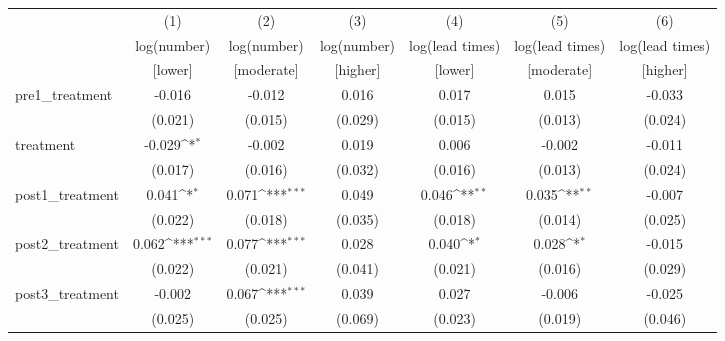 {
\def\sym#1{\ifmmode^{#1}\else\(^{#1}\)\fi}
\begin{adjustbox}{max width=\textwidth}
\begin{tabular}{l*{6}{c}}
\toprule
            &\multicolumn{1}{c}{(1)}&\multicolumn{1}{c}{(2)}&\multicolumn{1}{c}{(3)}&\multicolumn{1}{c}{(4)}&\multicolumn{1}{c}{(5)}&\multicolumn{1}{c}{(6)}\\
            &\multicolumn{1}{c}{log(number)}&\multicolumn{1}{c}{log(number)}&\multicolumn{1}{c}{log(number)}&\multicolumn{1}{c}{log(lead times)}&\multicolumn{1}{c}{log(lead times)}&\multicolumn{1}{c}{log(lead times)}\\
&[lower]&[moderate]&[higher]&[lower]&[moderate]&[higher]\\
\midrule
pre1\_treatment&      -0.016         &      -0.012         &       0.016         &       0.017         &       0.015         &      -0.033         \\
            &     (0.021)         &     (0.015)         &     (0.029)         &     (0.015)         &     (0.013)         &     (0.024)         \\
\addlinespace
treatment   &      -0.029\sym{*}  &      -0.002         &       0.019         &       0.006         &      -0.002         &      -0.011         \\
            &     (0.017)         &     (0.016)         &     (0.032)         &     (0.016)         &     (0.013)         &     (0.024)         \\
\addlinespace
post1\_treatment&       0.041\sym{*}  &       0.071\sym{***}&       0.049         &       0.046\sym{**} &       0.035\sym{**} &      -0.007         \\
            &     (0.022)         &     (0.018)         &     (0.035)         &     (0.018)         &     (0.014)         &     (0.025)         \\
\addlinespace
post2\_treatment&       0.062\sym{***}&       0.077\sym{***}&       0.028         &       0.040\sym{*}  &       0.028\sym{*}  &      -0.015         \\
            &     (0.022)         &     (0.021)         &     (0.041)         &     (0.021)         &     (0.016)         &     (0.029)         \\
\addlinespace
post3\_treatment&      -0.002         &       0.067\sym{***}&       0.039         &       0.027         &      -0.006         &      -0.025         \\
            &     (0.025)         &     (0.025)         &     (0.069)         &     (0.023)         &     (0.019)         &     (0.046)         \\

\end{tabular}
\end{adjustbox}}
